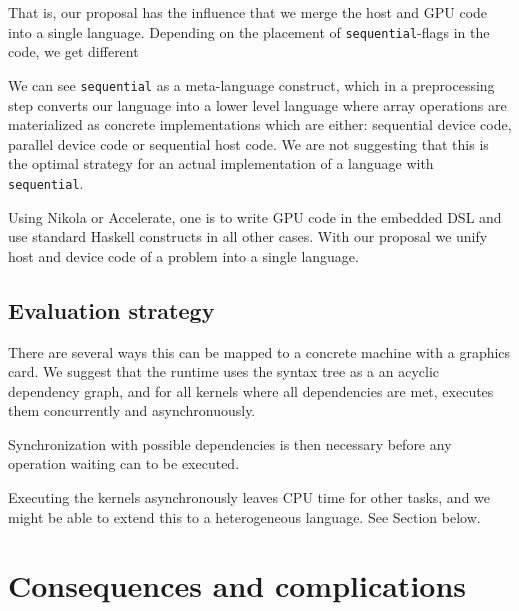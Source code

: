That is, our proposal has the influence that we merge the host and GPU
code into a single language. Depending on the placement of
\lstinline{sequential}-flags in the code, we get different

We can see \lstinline{sequential} as a meta-language construct, which
in a preprocessing step converts our language into a lower level
language where array operations are materialized as concrete
implementations which are either: sequential device code, parallel
device code or sequential host code. We are not suggesting that this
is the optimal strategy for an actual implementation of a language
with \lstinline{sequential}.

Using Nikola or Accelerate, one is to write GPU code in the embedded
DSL and use standard Haskell constructs in all other cases. With our
proposal we unify host and device code of a problem into a single
language.

\subsection{Evaluation strategy}
There are several ways this can be mapped to a concrete machine with a
graphics card. We suggest that the runtime uses the syntax tree as a
an acyclic dependency graph, and for all kernels where all
dependencies are met, executes them concurrently and asynchronuously.

Synchronization with possible dependencies is then necessary before
any operation waiting can to be executed.

Executing the kernels asynchronously leaves CPU time for other tasks,
and we might be able to extend this to a heterogeneous language. See
Section  below.

\section{Consequences and complications}

